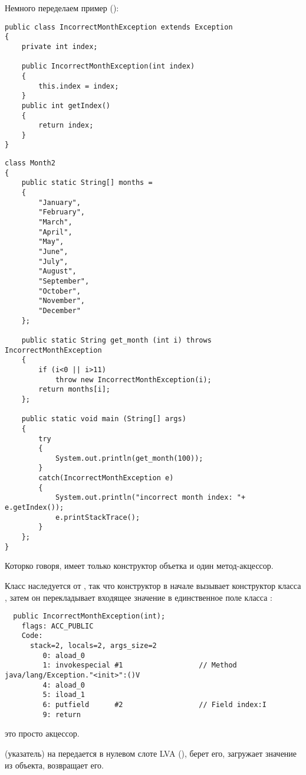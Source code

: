 
Немного переделаем пример  ():

\begin{lstlisting}[caption=IncorrectMonthException.java]
public class IncorrectMonthException extends Exception
{
	private int index;

	public IncorrectMonthException(int index)
	{
		this.index = index;
	} 
	public int getIndex()
	{
		return index;
	}
}
\end{lstlisting}

\begin{lstlisting}[caption=Month2.java]
class Month2
{
	public static String[] months = 
	{
		"January", 
		"February", 
		"March", 
		"April",
		"May",
		"June",
		"July",
		"August",
		"September",
		"October",
		"November",
		"December"
	};

	public static String get_month (int i) throws IncorrectMonthException
	{
		if (i<0 || i>11)
			throw new IncorrectMonthException(i);
		return months[i];
	};

	public static void main (String[] args)
	{
		try
		{
			System.out.println(get_month(100));
		}
		catch(IncorrectMonthException e)
		{
			System.out.println("incorrect month index: "+ e.getIndex());
			e.printStackTrace();
		}
	};
}
\end{lstlisting}

Которко говоря,  имеет только конструктор объетка и один
метод-акцессор.

Класс  наследуется от , 
так что конструктор 
в начале вызывает конструктор класса , 
затем он перекладывает входящее значение в единственное поле класса :

\begin{lstlisting}
  public IncorrectMonthException(int);
    flags: ACC_PUBLIC
    Code:
      stack=2, locals=2, args_size=2
         0: aload_0       
         1: invokespecial #1                  // Method java/lang/Exception."<init>":()V
         4: aload_0       
         5: iload_1       
         6: putfield      #2                  // Field index:I
         9: return        
\end{lstlisting}

 это просто акцессор.

 (указатель) на  передается в нулевом слоте \ac{LVA}
(),  берет его,  загружает значение из объекта, 
 возвращает его.

